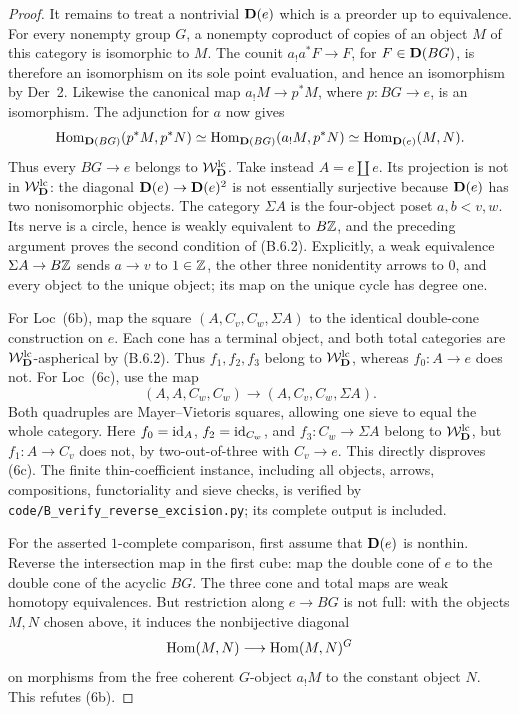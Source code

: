 \begin{proof}
It remains to treat a nontrivial $\mathbf D(e)$ which is a preorder
up to equivalence. For every nonempty group $G$, a nonempty
coproduct of copies of an object $M$ of this category is
isomorphic to $M$. The counit
$a_!a^*F\to F$, for $F\in\mathbf D(BG)$, is therefore an
isomorphism on its sole point evaluation, and hence an
isomorphism by Der~2. Likewise the canonical map
$a_!M\to p^*M$, where $p:BG\to e$, is an isomorphism.
The adjunction for $a$ now gives
\[
 \operatorname{Hom}_{\mathbf D(BG)}(p^*M,p^*N)
 \simeq\operatorname{Hom}_{\mathbf D(BG)}(a_!M,p^*N)
 \simeq\operatorname{Hom}_{\mathbf D(e)}(M,N).
\]
Thus every $BG\to e$ belongs to $\mathcal W_{\mathbf D}^{\mathrm{lc}}$. Take instead
$A=e\amalg e$. Its projection is not in $\mathcal W_{\mathbf D}^{\mathrm{lc}}$: the
diagonal $\mathbf D(e)\to\mathbf D(e)^2$ is not essentially surjective
because $\mathbf D(e)$ has two nonisomorphic objects. The category
$\Sigma A$ is the four-object poset
$a,b<v,w$. Its nerve is a circle, hence is weakly equivalent
to $B\mathbb Z$, and the preceding argument proves the second
condition of (B.6.2). Explicitly, a weak equivalence
$\Sigma A\to B\mathbb Z$ sends $a\to v$ to $1\in\mathbb Z$, the
other three nonidentity arrows to $0$, and every object to
the unique object; its map on the unique cycle has degree one.

For Loc~(6b), map the square
$(A,C_v,C_w,\Sigma A)$ to the identical double-cone
construction on $e$. Each cone has a terminal object, and
both total categories are $\mathcal W_{\mathbf D}^{\mathrm{lc}}$-aspherical by (B.6.2).
Thus $f_1,f_2,f_3$ belong to $\mathcal W_{\mathbf D}^{\mathrm{lc}}$, whereas
$f_0:A\to e$ does not. For Loc~(6c), use the map
\[
 (A,A,C_w,C_w)\longrightarrow(A,C_v,C_w,\Sigma A).
\tag{B.6.3}
\]
Both quadruples are Mayer--Vietoris squares, allowing one
sieve to equal the whole category. Here $f_0=\mathrm{id}_A$,
$f_2=\mathrm{id}_{C_w}$, and $f_3:C_w\to\Sigma A$ belong to
$\mathcal W_{\mathbf D}^{\mathrm{lc}}$, but $f_1:A\to C_v$ does not, by two-out-of-three
with $C_v\to e$. This directly disproves (6c).
The finite thin-coefficient instance, including all objects,
arrows, compositions, functoriality and sieve checks, is
verified by \texttt{code/B\_verify\_reverse\_excision.py};
its complete output is included.

For the asserted $1$-complete comparison, first assume
that $\mathbf D(e)$ is nonthin. Reverse the intersection map in
the first cube: map the double cone of $e$ to the double
cone of the acyclic $BG$. The three cone and total maps
are weak homotopy equivalences. But restriction along
$e\to BG$ is not full: with the objects $M,N$ chosen
above, it induces the nonbijective diagonal
\[
 \operatorname{Hom}(M,N)\longrightarrow\operatorname{Hom}(M,N)^G
\]
on morphisms from the free coherent $G$-object $a_!M$
to the constant object $N$. This refutes (6b).


\end{proof}
